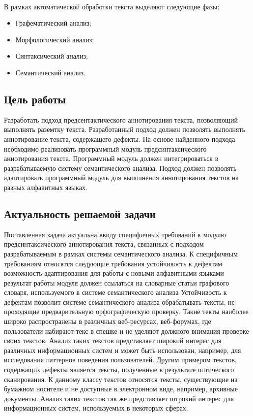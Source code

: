 \paragraph{}
В рамках автоматической обработки текста выделяют следующие фазы:
\begin{itemize}
\item
Графематический анализ;
\item
Морфологический анализ;
\item
Синтаксический анализ;
\item
Семантический анализ.
\end{itemize}


\subsection{Цель работы}
Разработать подход предсентактического аннотирования текста, позволяющий выполнять раземтку текста. Разработанный подход должен позволять выполнять аннотирование текста, содержащего дефекты. На основе найденного подхода необходимо реализовать программный модуль предсинтаксического аннотирования текста. Программный модуль должен интегрироваться в разрабатываемую систему семантического анализа. Подход должен позволять адаптировать программный модуль для выполнения аннотирования текстов на разных алфавитных языках.

\subsection{Актуальность решаемой задачи}
Поставленная задача актуальна ввиду специфичных требований к модулю предсинтаксического аннотирования текста, связанных с подходом разрабатываемым в рамках системы семантического анализа. 
К специфичным требованиям относятся следующие требования
устойчивость к дефектам 
возможность адаптирования для работы с новыми алфавитными языками
результат работы модуля должен ссылаться на словарные статьи графового словаря, используемого в системе семантического анализа
Устойчивость к дефектам позволит системе семантического анализа обрабатывать тексты, не проходящие предварительную орфографическую проверку. Такие текты наиболее широко распространены в различных веб-ресурсах, веб-форумах, где пользователи набирают текс в спешке и не уделяют должного внимания проверке своих текстов. Анализ таких текстов представляет широкий интерес для различных информационных систем и может быть использован, например,  для исследования паттернов поведения пользователей. Другим примером текстов, содержащих дефекты является тексты, полученные в результате оптического сканирования. К данному классу текстов относятся тексты, существующие на бумажном носителе и не доступные в электронном виде, например, архивные документы. Анализ таких текстов так же представляет штрокий интерес для информационных систем, используемых в некоторых сферах.